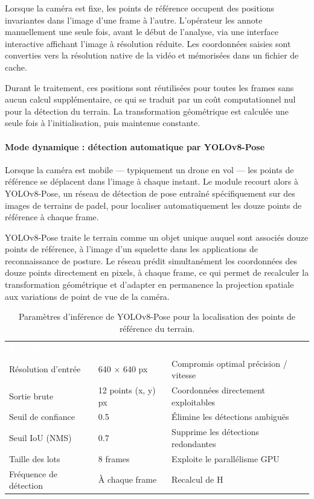 Lorsque la caméra est fixe, les points de référence occupent des positions invariantes dans l'image d'une frame à l'autre. L'opérateur les annote manuellement une seule fois, avant le début de l'analyse, via une interface interactive affichant l'image à résolution réduite. Les coordonnées saisies sont converties vers la résolution native de la vidéo et mémorisées dans un fichier de cache.

Durant le traitement, ces positions sont réutilisées pour toutes les frames sans aucun calcul supplémentaire, ce qui se traduit par un coût computationnel nul pour la détection du terrain. La transformation géométrique est calculée une seule fois à l'initialisation, puis maintenue constante.

\paragraph{Mode dynamique : détection automatique par YOLOv8-Pose}

Lorsque la caméra est mobile — typiquement un drone en vol — les points de référence se déplacent dans l'image à chaque instant. Le module recourt alors à YOLOv8-Pose, un réseau de détection de pose entraîné spécifiquement sur des images de terrains de padel, pour localiser automatiquement les douze points de référence à chaque frame.

YOLOv8-Pose traite le terrain comme un objet unique auquel sont associés douze points de référence, à l'image d'un squelette dans les applications de reconnaissance de posture. Le réseau prédit simultanément les coordonnées des douze points directement en pixels, à chaque frame, ce qui permet de recalculer la transformation géométrique   et d'adapter en permanence la projection spatiale aux variations de point de vue de la caméra.

\begin{table}[H]
  \centering
  \renewcommand{\arraystretch}{1.3}
  \begin{tabularx}{\textwidth}{L{4cm} C{3cm} X}
    \textcolor{white}{\textbf{Paramètre}} &
    \textcolor{white}{\textbf{Valeur}} &
    \textcolor{white}{\textbf{Justification}} \\
    Résolution d'entrée & 640 × 640 px & Compromis optimal précision / vitesse \\
    Sortie brute & 12 points (x, y) px & Coordonnées directement exploitables \\
    Seuil de confiance & 0.5 & Élimine les détections ambiguës \\
    Seuil IoU (NMS) & 0.7 & Supprime les détections redondantes \\
    Taille des lots & 8 frames & Exploite le parallélisme GPU \\
    Fréquence de détection & À chaque frame & Recalcul de H   \\
  \end{tabularx}
  \caption{Paramètres d'inférence de YOLOv8-Pose pour la localisation des points de référence du terrain.}
  \label{tab:yolopose_params}
\end{table}

